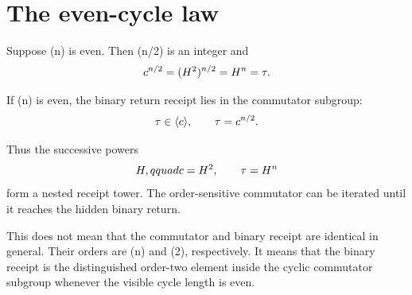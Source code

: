 \section{The even-cycle law}

Suppose (n) is even. Then (n/2) is an integer and
\[
c^{n/2}
=(H^2)^{n/2}
=H^n
=\tau.
\]

\begin{proposition}
If (n) is even, the binary return receipt lies in the commutator subgroup:
\[
\tau\in\langle c\rangle,
\qquad
\tau=c^{n/2}.
\]
\end{proposition}

Thus the successive powers
\[
H,qquad
c=H^2,
\qquad
\tau=H^n
\]
form a nested receipt tower. The order-sensitive commutator can be iterated
until it reaches the hidden binary return.

This does not mean that the commutator and binary receipt are identical in
general. Their orders are (n) and (2), respectively. It means that the
binary receipt is the distinguished order-two element inside the cyclic
commutator subgroup whenever the visible cycle length is even.

